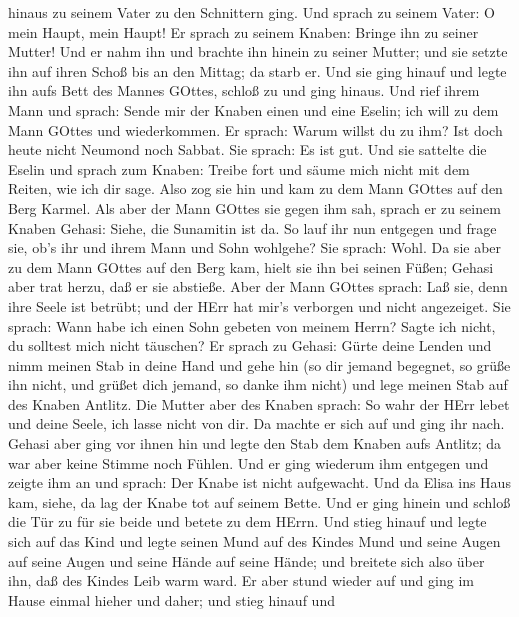 hinaus zu seinem Vater zu den Schnittern ging.  Und sprach
zu seinem Vater: O mein Haupt, mein Haupt! Er sprach zu seinem Knaben:
Bringe ihn zu seiner Mutter!  Und er nahm ihn und brachte
ihn hinein zu seiner Mutter; und sie setzte ihn auf ihren Schoß bis an
den Mittag; da starb er.  Und sie ging hinauf und legte ihn
aufs Bett des Mannes GOttes, schloß zu und ging hinaus. 
Und rief ihrem Mann und sprach: Sende mir der Knaben einen und eine
Eselin; ich will zu dem Mann GOttes und wiederkommen.  Er
sprach: Warum willst du zu ihm? Ist doch heute nicht Neumond noch
Sabbat. Sie sprach: Es ist gut.  Und sie sattelte die
Eselin und sprach zum Knaben: Treibe fort und säume mich nicht mit dem
Reiten, wie ich dir sage.  Also zog sie hin und kam zu dem
Mann GOttes auf den Berg Karmel. Als aber der Mann GOttes sie gegen ihm
sah, sprach er zu seinem Knaben Gehasi: Siehe, die Sunamitin ist da.
 So lauf ihr nun entgegen und frage sie, ob's ihr und ihrem
Mann und Sohn wohlgehe? Sie sprach: Wohl.  Da sie aber zu
dem Mann GOttes auf den Berg kam, hielt sie ihn bei seinen Füßen; Gehasi
aber trat herzu, daß er sie abstieße. Aber der Mann GOttes sprach: Laß
sie, denn ihre Seele ist betrübt; und der HErr hat mir's verborgen und
nicht angezeiget.  Sie sprach: Wann habe ich einen Sohn
gebeten von meinem Herrn? Sagte ich nicht, du solltest mich nicht
täuschen?  Er sprach zu Gehasi: Gürte deine Lenden und nimm
meinen Stab in deine Hand und gehe hin (so dir jemand begegnet, so grüße
ihn nicht, und grüßet dich jemand, so danke ihm nicht) und lege meinen
Stab auf des Knaben Antlitz.  Die Mutter aber des Knaben
sprach: So wahr der HErr lebet und deine Seele, ich lasse nicht von dir.
Da machte er sich auf und ging ihr nach.  Gehasi aber ging
vor ihnen hin und legte den Stab dem Knaben aufs Antlitz; da war aber
keine Stimme noch Fühlen. Und er ging wiederum ihm entgegen und zeigte
ihm an und sprach: Der Knabe ist nicht aufgewacht.  Und da
Elisa ins Haus kam, siehe, da lag der Knabe tot auf seinem Bette.
 Und er ging hinein und schloß die Tür zu für sie beide und
betete zu dem HErrn.  Und stieg hinauf und legte sich auf
das Kind und legte seinen Mund auf des Kindes Mund und seine Augen auf
seine Augen und seine Hände auf seine Hände; und breitete sich also über
ihn, daß des Kindes Leib warm ward.  Er aber stund wieder
auf und ging im Hause einmal hieher und daher; und stieg hinauf und

